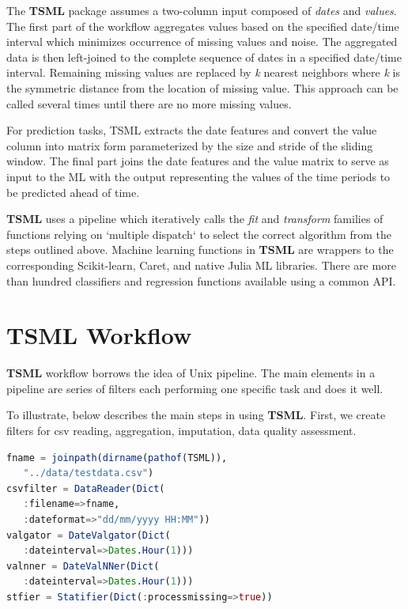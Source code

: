 \documentclass{juliacon}
\begin{document}
The \textbf{TSML} package assumes a two-column input composed of \emph{dates} and \emph{values}. 
The first part of the workflow aggregates values based on the specified date/time 
interval which minimizes occurrence of missing values and noise. The aggregated 
data is then left-joined to the complete sequence of dates in a specified date/time interval. 
Remaining missing values are replaced by \textit{k} nearest neighbors where \textit{k} is the symmetric 
distance from the location of missing value. This approach can be called several 
times until there are no more missing values.

For prediction tasks, TSML extracts the date features and 
convert the value column into matrix form parameterized by 
the size and stride of the sliding window. The final part joins
 the date features and the value matrix to serve as input to the 
 ML with the output representing the values of the time periods 
 to be predicted ahead of time.
 
\textbf{TSML} uses a pipeline which iteratively calls the \emph{fit} and \emph{transform}
families of functions relying on `multiple dispatch` to select the correct 
algorithm from the steps outlined above. Machine learning functions in 
\textbf{TSML} are wrappers to the corresponding Scikit-learn, Caret, and native Julia ML libraries. 
There are more than hundred classifiers and regression functions available using a common API.

\section{TSML Workflow}
\label{sec:tsmlworkflow}
%

\textbf{TSML} workflow borrows the idea of Unix pipeline.
The main elements in a pipeline are series of filters
each performing one specific task and does it well. 

\vskip 6pt
To illustrate, below describes the main steps in using \textbf{TSML}.
First, we create filters for csv reading, aggregation, imputation, data quality
assessment.

\begin{lstlisting}[language = Julia]
fname = joinpath(dirname(pathof(TSML)),
   "../data/testdata.csv")
csvfilter = DataReader(Dict(
   :filename=>fname,
   :dateformat=>"dd/mm/yyyy HH:MM"))
valgator = DateValgator(Dict(
   :dateinterval=>Dates.Hour(1)))
valnner = DateValNNer(Dict(
   :dateinterval=>Dates.Hour(1)))
stfier = Statifier(Dict(:processmissing=>true))
\end{lstlisting}
\end{document}
